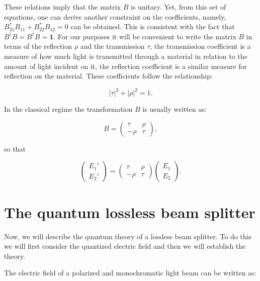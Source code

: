 \documentclass[12pt]{book}
\begin{document}
These relations imply that the matrix $B$ is unitary. Yet, from this set of equations, one can derive another constraint on the coefficients, namely, $B_{21}^{*} B_{11}+B_{22}^{*} B_{12}=0$ can be obtained. This is consistent with the fact that $B^{\dagger}B=B^{\dagger}B= \mathbf{1}$. For our purposes it will be convenient to write the matrix $B$ in terms of the reflection $\rho$ and the transmission $\tau$, the transmission coefficient is a measure of how much light is transmitted through a material in relation to the amount of light incident on it, the reflection coefficient is a similar measure for reflection on the material. These coefficients follow the relationship:

\begin{equation}
|\tau|^{2}+|\rho|^{2}=1.
\end{equation}
 
 In the classical regime the transformation $B$ is usually written as:
 
 \begin{equation}
 B=\begin{pmatrix} \tau & \rho \\ -\rho & \tau \end{pmatrix},
 \end{equation}


so that

\begin{equation}
\begin{pmatrix} E_{1}' \\ E_{2}' \end{pmatrix}=\begin{pmatrix} \tau & \rho \\ -\rho & \tau \end{pmatrix} \begin{pmatrix} E_{1} \\ E_{2} \end{pmatrix}.
\end{equation}




\section{The quantum lossless beam splitter}

Now, we will describe the quantum theory of a lossless beam splitter. To do this we will first consider the quantized electric field and then we will establish the theory. 


The electric field of a polarized and monochromatic light beam can be written as:
\end{document}
